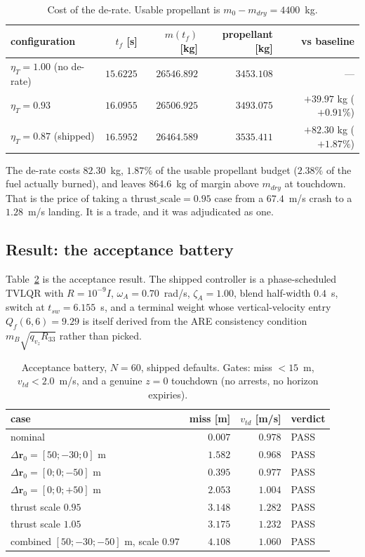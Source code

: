 \documentclass[11pt]{article}
\newcommand{\rvec}{\mathbf{r}}
\newcommand{\etaT}{\eta_T}
\begin{document}
\begin{table}[htbp]
\centering
\caption{Cost of the de-rate. Usable propellant is
$m_0 - m_{dry} = 4400$~kg.}
\label{tab:derate}
\begin{tabular}{lrrrr}
\toprule
configuration & $t_f$ [s] & $m(t_f)$ [kg] & propellant [kg] & vs baseline \\
\midrule
$\etaT = 1.00$ (no de-rate) & $15.6225$ & $26546.892$ & $3453.108$ & --- \\
$\etaT = 0.93$              & $16.0955$ & $26506.925$ & $3493.075$ & $+39.97$ kg ($+0.91\%$) \\
$\etaT = 0.87$ (shipped)    & $16.5952$ & $26464.589$ & $3535.411$ & $+82.30$ kg ($+1.87\%$) \\
\bottomrule
\end{tabular}
\end{table}

The de-rate costs $82.30$~kg, $1.87\%$ of the usable propellant budget
($2.38\%$ of the fuel actually burned), and leaves $864.6$~kg of margin
above $m_{dry}$ at touchdown. That is the price of taking a
$\text{thrust\_scale} = 0.95$ case from a $67.4$~m/s crash to a $1.28$~m/s
landing. It is a trade, and it was adjudicated as one.

\subsection{Result: the acceptance battery}
\label{sec:battery}

Table~\ref{tab:battery} is the acceptance result. The shipped controller
is a phase-scheduled TVLQR with $R = 10^{-9}I$,
$\omega_A = 0.70$~rad/s, $\zeta_A = 1.00$, blend half-width $0.4$~s,
switch at $t_{sw} = 6.155$~s, and a terminal weight whose vertical-velocity
entry $Q_f(6,6) = 9.29$ is itself derived from the ARE consistency
condition $m_B\sqrt{q_{v_z} R_{33}}$ rather than picked.

\begin{table}[htbp]
\centering
\caption{Acceptance battery, $N = 60$, shipped defaults. Gates: miss $<
15$~m, $v_{td} < 2.0$~m/s, and a genuine $z=0$ touchdown (no arrests, no
horizon expiries).}
\label{tab:battery}
\begin{tabular}{lrrl}
\toprule
case & miss [m] & $v_{td}$ [m/s] & verdict \\
\midrule
nominal                                & $0.007$ & $0.978$ & PASS \\
$\Delta\rvec_0 = [50;-30;0]$ m         & $1.582$ & $0.968$ & PASS \\
$\Delta\rvec_0 = [0;0;-50]$ m          & $0.395$ & $0.977$ & PASS \\
$\Delta\rvec_0 = [0;0;+50]$ m          & $2.053$ & $1.004$ & PASS \\
thrust scale $0.95$                    & $3.148$ & $1.282$ & PASS \\
thrust scale $1.05$                    & $3.175$ & $1.232$ & PASS \\
combined $[50;-30;-50]$ m, scale $0.97$& $4.108$ & $1.060$ & PASS \\
\bottomrule
\end{tabular}
\end{table}
\end{document}
